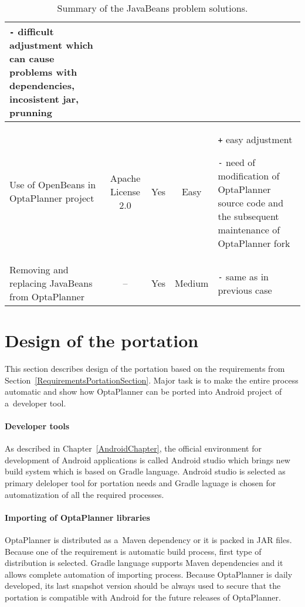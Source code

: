 \begin{table}[h!]
{\begin{tabular}{|l|c|c|c|p{5cm}|}
            \texttt{-} difficult adjustment which can cause problems with dependencies, incosistent jar, prunning
            \\ \hline

            \multicolumn{1}{|p{2.5cm}|}{Use of OpenBeans in OptaPlanner project} &
            \multicolumn{1}{p{2cm}|}{\centering Apache License 2.0} &
            Yes &
            Easy &
            \texttt{+} easy adjustment

            \texttt{-} need of modification of OptaPlanner source code and the subsequent maintenance of
            OptaPlanner fork \\ \hline

            \multicolumn{1}{|p{2.5cm}|}{Removing and replacing JavaBeans from OptaPlanner} &
            -- &
            Yes &
            Medium &
            \texttt{-} same as in previous case\\ \hline
        \end{tabular}
    }
    \centering
    \caption{Summary of the JavaBeans problem solutions.}
    \label{SummaryJavaBeansTable}
\end{table}

\section{Design of the portation}\label{PortationDesignSection}
This section describes design of the portation based on the requirements from
Section~\ref{RequirementsPortationSection}. Major task is to make the entire process automatic and show how OptaPlanner
can be ported into Android project of a~developer tool.

\paragraph{Developer tools}
As described in Chapter~\ref{AndroidChapter}, the official environment for development of Android applications is called
Android studio which brings new build system which is based on Gradle language. Android studio is selected as primary
deleloper tool for portation needs and Gradle laguage is chosen for automatization of all the required processes.

\paragraph{Importing of OptaPlanner libraries}
OptaPlanner is distributed as a~Maven dependency or it is packed in JAR files. Because one of the requirement is
automatic build process, first type of distribution is selected. Gradle language supports Maven dependencies and it
allows complete automation of importing process. Because OptaPlanner is daily developed, its last snapshot version
should be always used to secure that the portation is compatible with Android for the future releases of OptaPlanner.

